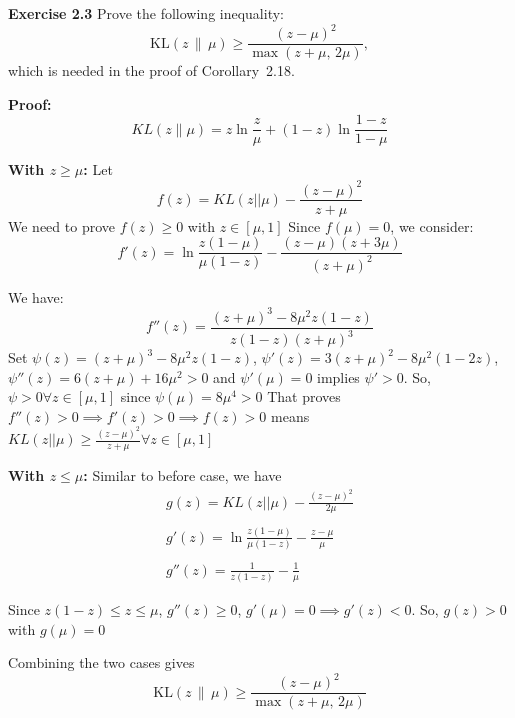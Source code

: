 \textbf{Exercise 2.3}
Prove the following inequality:
\[
\mathrm{KL}(z \,\|\, \mu) \geq \frac{(z - \mu)^2}{\max(z + \mu,\, 2\mu)},
\]
which is needed in the proof of Corollary~2.18.

\textbf{Proof:}
\[
KL(z\|\mu) = z\ln\frac{z}{\mu} + (1-z)\ln\frac{1-z}{1-\mu}
\]

\textbf{With $z \geq \mu$:}
Let 
\begin{equation}
    f(z) = KL(z||\mu) - \frac{(z - \mu)^2}{z + \mu}
\end{equation}
We need to prove $f(z) \geq 0$ with $z \in [\mu, 1]$
Since $f(\mu) = 0$, we consider:
\begin{equation}
f'(z) = \ln \frac{z(1-\mu)}{\mu (1-z)} - \frac{(z-\mu)(z+3\mu)}{(z+\mu)^2}
\end{equation}

We have:
\begin{equation}
    f''(z) = \frac{(z+\mu)^3 - 8\mu^2z(1-z)}{z(1-z)(z+\mu)^3}
\end{equation}
Set $\psi(z) = (z+\mu)^3 - 8\mu^2z(1-z)$, $\psi'(z) = 3(z+\mu)^2 - 8\mu^2(1-2z)$, $\psi''(z) = 6(z+\mu) + 16\mu^2 > 0$ and $\psi'(\mu) = 0$ implies $\psi' > 0$. So, $\psi > 0 \forall z \in [\mu, 1]$ since $\psi(\mu) = 8 \mu^4 > 0$
That proves $f''(z) > 0 \implies f'(z) > 0 \implies f(z) > 0$ means $KL(z||\mu) \geq \frac{(z-\mu)^2}{z + \mu} \forall z \in[\mu, 1]$

\textbf{With $z \leq \mu$:}
Similar to before case, we have
\begin{equation}
    \begin{split}
    g(z) = KL(z||\mu) - \frac{(z-\mu)^2}{2\mu}\\\\
    g'(z) = \ln \frac{z(1-\mu)}{\mu (1-z)} - \frac{z-\mu}{\mu}\\\\
    g''(z) = \frac{1}{z(1-z)} - \frac{1}{\mu}
    \end{split}
\end{equation}

Since $z(1-z) \leq z \leq \mu $, $g''(z) \geq 0$, $g'(\mu) = 0 \implies g'(z) < 0$. So, $g(z) > 0$ with $g(\mu) = 0$

Combining the two cases gives
\[
\mathrm{KL}(z \,\|\, \mu) \geq \frac{(z - \mu)^2}{\max(z + \mu,\, 2\mu)}
\]